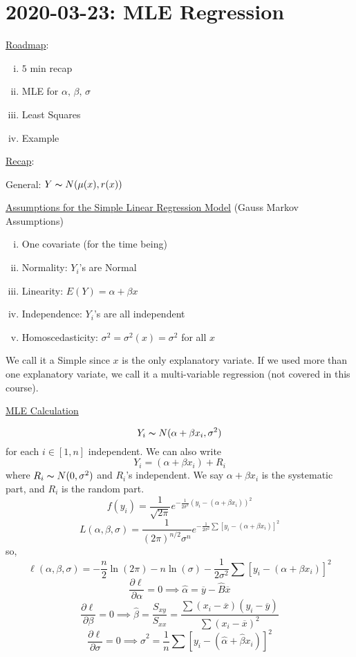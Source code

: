 \section{2020-03-23: MLE Regression}
\underline{Roadmap}:
\begin{enumerate}[(i)]
    \item $ 5 $ min recap
    \item MLE for $ \alpha,\,\beta,\,\sigma $
    \item Least Squares
    \item Example
\end{enumerate}

\underline{Recap}:

General: $ Y \thicksim N(\mu(x),r(x)) $

\underline{Assumptions for the Simple Linear Regression Model}
(Gauss Markov Assumptions)
\begin{enumerate}[(i)]
    \item One covariate (for the time being)
    \item Normality: $ Y_i $'s are Normal
    \item Linearity: $ E(Y)=\alpha+\beta x $
    \item Independence: $ Y_i $'s are all independent
    \item Homoscedasticity: $ \sigma^2=\sigma^2(x)=\sigma^2 $ for all $ x $
\end{enumerate}
We call it a Simple since $ x $ is the only
explanatory variate. If we used more than one explanatory variate,
we call it a multi-variable regression (not covered in this course).

\underline{MLE Calculation}

\[ Y_i \thicksim N(\alpha+\beta x_i, \sigma^2) \]
for each $ i\in[1,n] $
independent. We can also write
\[ Y_i=(\alpha+\beta x_i)+R_i \]
where $ R_i \thicksim N(0,\sigma^2) $ and $ R_i $'s independent.
We say $ \alpha+\beta x_i $ is the systematic part, and $ R_i $ is the random part.
\[ f(y_i)=\frac{1}{\sqrt{2 \pi}}e^{-\frac{1}{2\sigma^2}(y_i-(\alpha+\beta x_i))^2}  \]
\[
    L(\alpha, \beta, \sigma)=
    \frac{1}{(2 \pi)^{n / 2} \sigma^{n}}
    e^{-\frac{1}{2 \sigma^{2}}
            \sum\left[y_{i}-\left(\alpha+\beta x_i\right)\right]^{2}}
\]
so,
\[ \ell(\alpha,\beta,\sigma)=-\frac{n}{2} \ln(2\pi)-n\ln(\sigma)-
    \frac{1}{2\sigma^2}\sum\left[y_{i}-\left(\alpha+\beta x_i\right)\right]^{2}  \]
\[ \frac{\partial\ell}{\partial\alpha}=0\implies
    \hat{\alpha}=\overline{y}-\hat{B}\overline{x} \]
\[ \frac{\partial \ell}{\partial \beta}=0\implies
    \hat{\beta}=\frac{S_{xy}}{S_{xx}}=\frac{\sum(x_i-\overline{x})(y_i-\overline{y})}
    {\sum (x_i-\overline{x})^2}  \]
\[ \frac{\partial\ell}{\partial \sigma}=0\implies
    \hat{\sigma}^2=\frac{1}{n} \sum \left[ y_i-(\hat{\alpha}+\hat{\beta}x_i) \right]^2 \]

